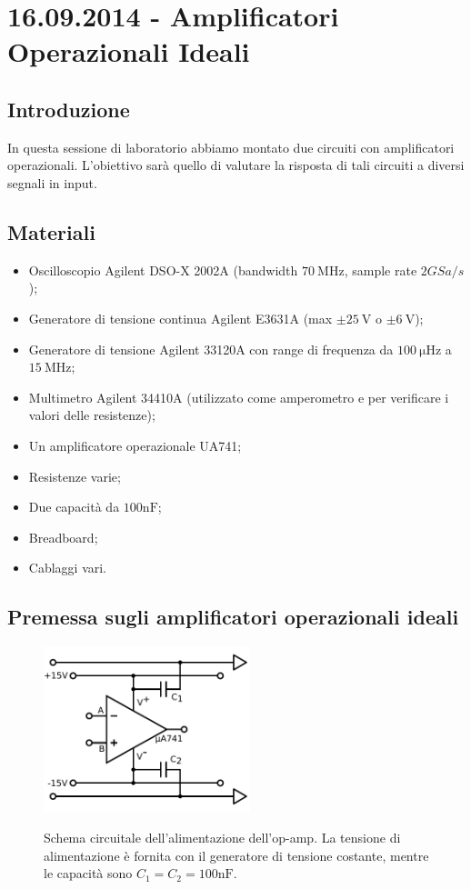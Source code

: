 \section{16.09.2014 - Amplificatori Operazionali Ideali}

\subsection{Introduzione}

In questa sessione di laboratorio abbiamo montato due circuiti con amplificatori operazionali. L'obiettivo sarà quello di valutare la risposta di tali circuiti a diversi segnali in input.

\subsection{Materiali}

\begin{itemize} [noitemsep]
\item Oscilloscopio Agilent DSO-X 2002A (bandwidth $\SI{70}{\mega\hertz}$, sample rate $2 GSa/s$);
\item Generatore di tensione continua Agilent E3631A (max $\pm \SI{25}{\volt}$ o $\pm \SI{6}{\volt}$);
\item Generatore di tensione Agilent 33120A con range di frequenza da $\SI{100}{\micro\hertz}$ a $\SI{15}{\mega\hertz}$;
\item Multimetro Agilent 34410A (utilizzato come amperometro e per verificare i valori delle resistenze);
\item Un amplificatore operazionale UA741;
\item Resistenze varie;  
\item Due capacità da $100 \si{\nano\farad}$;
\item Breadboard;
\item Cablaggi vari.
\end{itemize}

\subsection{Premessa sugli amplificatori operazionali ideali}

\begin{figure}
 \centering
   {\includegraphics[width=6cm]{../E01/latex/alimentazione.pdf}}
 \caption{Schema circuitale dell'alimentazione dell'op-amp. La tensione di alimentazione è fornita con il generatore di tensione costante, mentre le capacità sono $C_1=C_2=100 \si{\nano\farad}$.}
 \label{gr:costante}
\end{figure}

